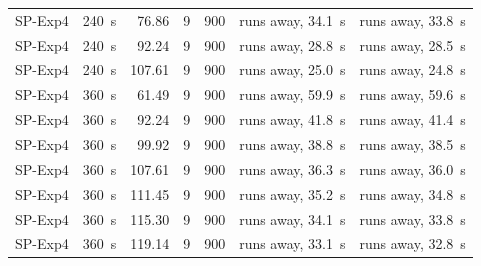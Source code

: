 {\begin{longtable}{llrrrll}
SP-Exp4 & 240~s & 76.86 & 9 & 900 & runs away, 34.1~s & runs away, 33.8~s \\
SP-Exp4 & 240~s & 92.24 & 9 & 900 & runs away, 28.8~s & runs away, 28.5~s \\
SP-Exp4 & 240~s & 107.61 & 9 & 900 & runs away, 25.0~s & runs away, 24.8~s \\
SP-Exp4 & 360~s & 61.49 & 9 & 900 & runs away, 59.9~s & runs away, 59.6~s \\
SP-Exp4 & 360~s & 92.24 & 9 & 900 & runs away, 41.8~s & runs away, 41.4~s \\
SP-Exp4 & 360~s & 99.92 & 9 & 900 & runs away, 38.8~s & runs away, 38.5~s \\
SP-Exp4 & 360~s & 107.61 & 9 & 900 & runs away, 36.3~s & runs away, 36.0~s \\
SP-Exp4 & 360~s & 111.45 & 9 & 900 & runs away, 35.2~s & runs away, 34.8~s \\
SP-Exp4 & 360~s & 115.30 & 9 & 900 & runs away, 34.1~s & runs away, 33.8~s \\
SP-Exp4 & 360~s & 119.14 & 9 & 900 & runs away, 33.1~s & runs away, 32.8~s \\
\bottomrule
\end{longtable}
}
